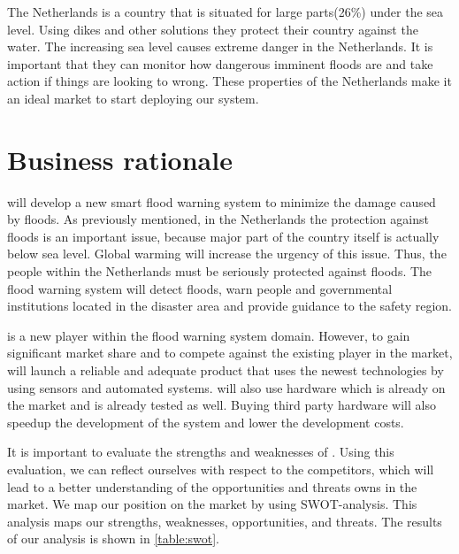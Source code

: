 The Netherlands is a country that is situated for large parts(26\%) under the sea level\cite{holland}. Using dikes and other solutions they protect their country against the water. The increasing sea level causes extreme danger in the Netherlands. It is important that they can monitor how dangerous imminent floods are and take action if things are looking to wrong. These properties of the Netherlands make it an ideal market to start deploying our system. %

\section{Business rationale}
\CompanyName{} will develop a new smart flood warning system to minimize the damage caused by floods. As previously mentioned, in the Netherlands the protection against floods is an important issue, because major part of the country itself is actually below sea level. Global warming will increase the urgency of this issue. Thus, the people within the Netherlands must be seriously protected against floods. The flood warning system will detect floods, warn people and governmental institutions located in the disaster area and provide guidance to the safety region.


\CompanyName{} is a new player within the flood warning system domain. However, to gain significant market share and to compete against the existing player in the market, \CompanyName{} will launch a reliable and adequate product that uses the newest technologies by using sensors and automated systems. \CompanyName{} will also use hardware which is already on the market and is already tested as well. Buying third party hardware will also speedup the development of the system and lower the development costs.

It is important to evaluate the strengths and weaknesses of \CompanyName{}. Using this evaluation, we can reflect ourselves with respect to the competitors, which will lead to a better understanding of the opportunities and threats \CompanyName{} owns in the market. We map our position on the market by using SWOT-analysis. This analysis maps our strengths, weaknesses, opportunities, and threats. The results of our analysis is shown in \autoref{table:swot}.

